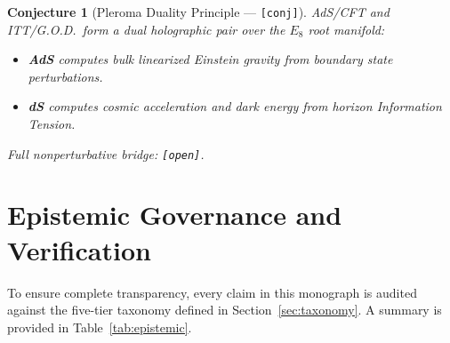 \documentclass[12pt,letterpaper]{article}
\theoremstyle{plain}
\newtheorem{conjecture}[theorem]{Conjecture}
\theoremstyle{definition}
\begin{document}
\begin{conjecture}[Pleroma Duality Principle --- {\normalfont\texttt{[conj]}}]
\label{conj:pleroma}
AdS/CFT and ITT/G.O.D.\ form a dual holographic pair over the $E_8$ root manifold:
\begin{itemize}[nosep]
  \item \textbf{AdS} computes bulk linearized Einstein gravity from boundary state perturbations.
  \item \textbf{dS} computes cosmic acceleration and dark energy from horizon Information Tension.
\end{itemize}
Full nonperturbative bridge: \textup{\texttt{[open]}}.
\end{conjecture}

\section{Epistemic Governance and Verification}
\label{sec:verification}

To ensure complete transparency, every claim in this monograph is audited against the five-tier taxonomy defined in Section~\ref{sec:taxonomy}. A summary is provided in Table~\ref{tab:epistemic}.
\end{document}
